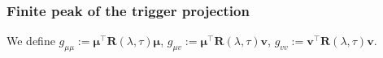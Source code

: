 \documentclass[11pt]{article}
\DeclareMathOperator{\tr}{tr}
\DeclareMathOperator{\prox}{prox}
\newcommand{\C}{\mathbf{C}}
\newcommand{\bv}{\mathbf{v}}
\newcommand{\bmu}{\boldsymbol{\mu}}
\newcommand{\btheta}{\boldsymbol{\theta}}
\begin{document}
    
    
    
    
    



\subsubsection{Finite peak of the trigger projection}

We define $g_{\mu\mu}:=\bmu^\top \mathbf{R}(\lambda,\tau)\bmu$, $g_{\mu v}:=\bmu^\top \mathbf{R}(\lambda,\tau)\bv$, $g_{vv}:=\bv^\top \mathbf{R}(\lambda,\tau)\bv$. 
\end{document}
